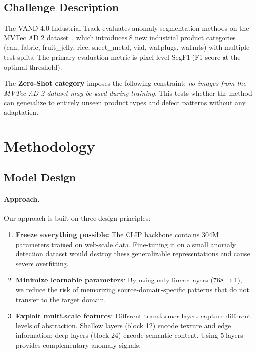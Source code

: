 \documentclass[10pt,twocolumn,letterpaper]{article}
\begin{document}
\subsection{Challenge Description}

The VAND 4.0 Industrial Track evaluates anomaly segmentation methods on the MVTec AD 2 dataset~\cite{mvtecad2}, which introduces 8 new industrial product categories (can, fabric, fruit\_jelly, rice, sheet\_metal, vial, wallplugs, walnuts) with multiple test splits. The primary evaluation metric is pixel-level SegF1 (F1 score at the optimal threshold).

The \textbf{Zero-Shot category} imposes the following constraint: \emph{no images from the MVTec AD 2 dataset may be used during training.} This tests whether the method can generalize to entirely unseen product types and defect patterns without any adaptation.

\section{Methodology}

\subsection{Model Design}

\paragraph{Approach.}
Our approach is built on three design principles:
\begin{enumerate}[nosep]
  \item \textbf{Freeze everything possible:} The CLIP backbone contains 304M parameters trained on web-scale data. Fine-tuning it on a small anomaly detection dataset would destroy these generalizable representations and cause severe overfitting.
  \item \textbf{Minimize learnable parameters:} By using only linear layers (768$\to$1), we reduce the risk of memorizing source-domain-specific patterns that do not transfer to the target domain.
  \item \textbf{Exploit multi-scale features:} Different transformer layers capture different levels of abstraction. Shallow layers (block 12) encode texture and edge information; deep layers (block 24) encode semantic content. Using 5 layers provides complementary anomaly signals.
\end{enumerate}
\end{document}

